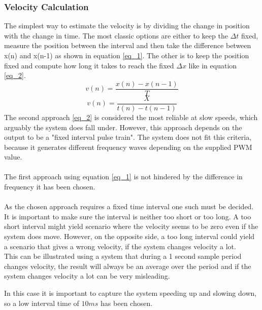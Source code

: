 \documentclass[../../../main]{subfiles}
\begin{document}
\subsubsection{Velocity Calculation}
The simplest way to estimate the velocity is by dividing the change in position with the change in time. The most classic options are either to keep the $\Delta t$ fixed, measure the position between the interval and then take the difference between x(n) and x(n-1) as shown in equation \ref{eq_1}. The other is to keep the position fixed and compute how long it takes to reach the fixed  $\Delta x$ like in equation \ref{eq_2}.
\begin{equation}
v(n) = \frac{x(n)-x(n-1)}{T}
\label{eq_1}
\end{equation}
\begin{equation}
  v(n) = \frac{X}{t(n)-t(n-1)}
  \label{eq_2}
\end{equation}
The second approach \ref{eq_2} is considered the most reliable at slow speeds, which arguably the system does fall under. However, this approach depends on the output to be a "fixed interval pulse train"\cite{Velocity_encoder}. The system does not fit this criteria, because it generates different frequency waves depending on the supplied PWM value.\\
\\
The first approach using equation \ref{eq_1} is not hindered by the difference in frequency it has been chosen.  \\
\\
 As the chosen approach requires a fixed time interval one such must be decided. It is important to make sure the interval is neither too short or too long.
 A too short interval might yield scenario where the velocity seems to be zero even if the system does move. However, on the opposite side, a too long interval could yield a scenario that gives a wrong velocity, if the system changes velocity a lot.
\\
This can be illustrated using a system that during a 1 second sample period changes velocity, the result will always be an average over the period and if the system changes velocity a lot can be very misleading.

In this case it is important to capture the system speeding up and slowing down, so a low interval time of $10ms$ has been chosen.
\end{document}
